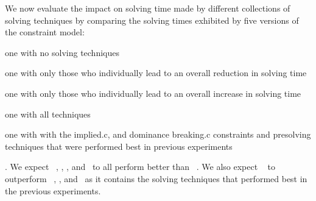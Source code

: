 We now evaluate the impact on solving time made by different collections of
solving techniques by comparing the solving times exhibited by five versions of
the \gls{constraint model}:
%
\begin{modelList}
  \item {}
    one with no solving techniques
  \item {}
    one with only those who individually lead to an overall reduction in solving
    time
  \item {}
    one with only those who individually lead to an overall increase in solving
    time
  \item {}
    one with all techniques
  \item {}
    one with with the \gls{implied.c},  and
    \gls{dominance breaking.c} \glspl{constraint} and \gls{presolving}
    techniques that were performed best in previous experiments
\end{modelList}.
%
We expect ~,
, ,
and~ to all perform better than
~.
%
We also expect ~ to
outperform ~,
, and~ as it contains the
solving techniques that performed best in the previous experiments.


